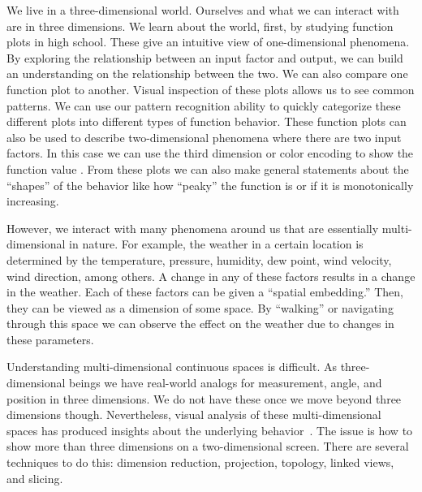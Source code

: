 
We live in a three-dimensional world. 
Ourselves and what we can interact with are in three dimensions.
We learn about the world, first, by studying function plots in high 
school. These give an intuitive view of one-dimensional 
phenomena. 
By exploring the relationship
between an input factor
and output,
we can build an understanding on the relationship between the two.
We can also compare one function plot to another. Visual inspection of these plots
allows us to see common patterns. We can use our pattern recognition ability
to quickly categorize these different plots into different types of function
behavior. These function plots can also be used to describe two-dimensional
phenomena where there are two input factors. In this case we can use the third
dimension or color encoding to show the function value . 
From these plots we can also make general statements about the ``shapes'' of
the behavior like how ``peaky'' the function is or if it is monotonically
increasing.

However, we interact with many phenomena around us that are essentially
multi-dimensional in nature. For example, the weather in a certain location is
determined by the temperature, pressure, humidity, dew point, wind velocity,
wind direction, among others. A change in any of these factors results in a
change in the weather. Each of these factors can be given a ``spatial
embedding.'' Then, they can be viewed as a dimension of some space.  By
``walking'' or navigating through this space we can observe the effect on the
weather due to changes in these parameters. 

Understanding multi-dimensional continuous spaces is difficult. As
three-dimensional beings we have real-world analogs for measurement,
angle, and position in three dimensions. We do not have these once we
move beyond three dimensions though. Nevertheless, visual analysis of
these multi-dimensional spaces has produced insights about the
underlying behavior~\cite{Sedlmair:2014}. The issue is how to show more
than three dimensions on a two-dimensional screen. There are several
techniques to do this: dimension reduction, projection, 
topology, linked views, and slicing.

